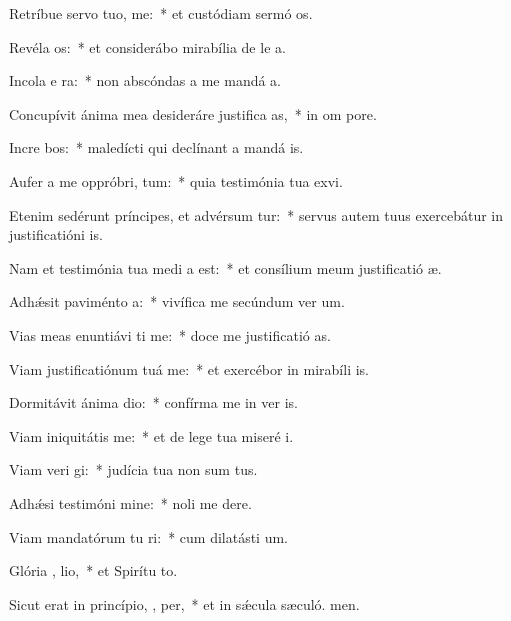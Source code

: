 \item Retríbue servo tuo,  me:~* et custódiam sermó os.
\item Revéla  os:~* et considerábo mirabília de le a.
\item Incola e   ra:~* non abscóndas a me mandá a.
\item Concupívit ánima mea desideráre justifica as,~* in om pore.
\item Incre bos:~* maledícti qui declínant a mandá is.
\item Aufer a me oppróbri,  tum:~* quia testimónia tua exvi.
\item Etenim sedérunt príncipes, et advérsum  tur:~* servus autem tuus exercebátur in justificatióni is.
\item Nam et testimónia tua medi a est:~* et consílium meum justificatió æ.
\item Adhǽsit paviménto  a:~* vivífica me secúndum ver um.
\item Vias meas enuntiávi  ti me:~* doce me justificatió as.
\item Viam justificatiónum tuá  me:~* et exercébor in mirabíli is.
\item Dormitávit ánima   dio:~* confírma me in ver is.
\item Viam iniquitátis   me:~* et de lege tua miseré i.
\item Viam veri gi:~* judícia tua non sum tus.
\item Adhǽsi testimóni  mine:~* noli me dere.
\item Viam mandatórum tu ri:~* cum dilatásti  um.
\item Glória ,  lio,~* et Spirítu to.
\item Sicut erat in princípio,  ,  per,~* et in sǽcula sæculó. men.
